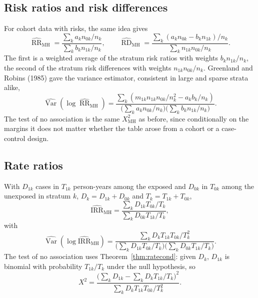 \documentclass[11pt,a4paper]{article}
\numberwithin{equation}{section}
\DeclareMathOperator{\Var}{Var}
\DeclareMathOperator{\RR}{RR}
\DeclareMathOperator{\RD}{RD}
\theoremstyle{definition}
\begin{document}
\subsection{Risk ratios and risk differences}

For cohort data with risks, the same idea gives
\[
\widehat{\RR}_{\text{MH}} = \frac{\sum_k a_k n_{0k}/n_k}{\sum_k b_k n_{1k}/n_k}, \qquad \widehat{\RD}_{\text{MH}} = \frac{\sum_k (a_k n_{0k} - b_k n_{1k})/n_k}{\sum_k n_{1k}n_{0k}/n_k} .
\]
The first is a weighted average of the stratum risk ratios with weights $b_k n_{1k}/n_k$, the second of the stratum risk differences with weights
$n_{1k}n_{0k}/n_k$. Greenland and Robins (1985) gave the variance estimator, consistent in large and sparse strata alike,
\[
\widehat{\Var}(\log\widehat{\RR}_{\text{MH}}) = \frac{\sum_k (m_{1k}n_{1k}n_{0k}/n_k^2 - a_k b_k/n_k)}{\bigl(\sum_k a_k n_{0k}/n_k\bigr)\bigl(\sum_k b_k n_{1k}/n_k\bigr)} .
\]
The test of no association is the same $X^2_{\text{MH}}$ as before, since conditionally on the margins it does not matter whether the table arose from
a cohort or a case-control design.

\subsection{Rate ratios}
\label{sec:mhrate}

With $D_{1k}$ cases in $T_{1k}$ person-years among the exposed and $D_{0k}$ in $T_{0k}$ among the unexposed in stratum $k$, $D_k = D_{1k} + D_{0k}$ and $T_k = T_{1k} + T_{0k}$,
\[
\widehat{\text{IRR}}_{\text{MH}} = \frac{\sum_k D_{1k}T_{0k}/T_k}{\sum_k D_{0k}T_{1k}/T_k} ,
\]
with
\[
\widehat{\Var}(\log\widehat{\text{IRR}}_{\text{MH}}) = \frac{\sum_k D_k T_{1k}T_{0k}/T_k^2}{\bigl(\sum_k D_{1k}T_{0k}/T_k\bigr)\bigl(\sum_k D_{0k}T_{1k}/T_k\bigr)} .
\]
The test of no association uses Theorem~\ref{thm:ratecond}: given $D_k$, $D_{1k}$ is binomial with probability $T_{1k}/T_k$ under the null hypothesis, so
\[
X^2 = \frac{\bigl(\sum_k D_{1k} - \sum_k D_k T_{1k}/T_k\bigr)^2}{\sum_k D_k T_{1k}T_{0k}/T_k^2} .
\]
\end{document}
